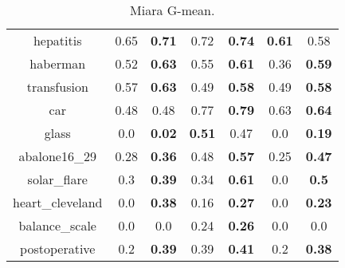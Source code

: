 \begin{table}[H]
\begin{center}
{\begin{tabular}{c|cccccc}
hepatitis&0.65&\textbf{0.71}&0.72&\textbf{0.74}&\textbf{0.61}&0.58\\%
haberman&0.52&\textbf{0.63}&0.55&\textbf{0.61}&0.36&\textbf{0.59}\\%
transfusion&0.57&\textbf{0.63}&0.49&\textbf{0.58}&0.49&\textbf{0.58}\\%
car&0.48&0.48&0.77&\textbf{0.79}&0.63&\textbf{0.64}\\%
glass&0.0&\textbf{0.02}&\textbf{0.51}&0.47&0.0&\textbf{0.19}\\%
abalone16\_29&0.28&\textbf{0.36}&0.48&\textbf{0.57}&0.25&\textbf{0.47}\\%
solar\_flare&0.3&\textbf{0.39}&0.34&\textbf{0.61}&0.0&\textbf{0.5}\\%
heart\_cleveland&0.0&\textbf{0.38}&0.16&\textbf{0.27}&0.0&\textbf{0.23}\\%
balance\_scale&0.0&0.0&0.24&\textbf{0.26}&0.0&0.0\\%
postoperative&0.2&\textbf{0.39}&0.39&\textbf{0.41}&0.2&\textbf{0.38}\\%
						\end{tabular}}
						\caption{Miara G-mean.}
						\label{gmeansmote}
					\end{center}
				\end{table}		
